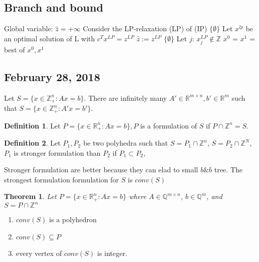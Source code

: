 \documentclass{article}
\theoremstyle{plain}
\newtheorem{thm}{Theorem}
\theoremstyle{definition}
\newtheorem{defn}{Definition}
\begin{document}
\subsection{Branch and bound}
\begin{algorithmic}[1]
    \State Global variable: $\hat{z} = +\infty$
        \State Consider the LP-relaxation (LP) of (IP)
         \Return $\{\emptyset\}$
        \EndIf
        \State Let $x^{lp}$ be an optimal solution of L with $c^Tx^{LP} = z^{LP}$
            \State $\hat{z} := z^{LP}$
            \Else
            \State \Return $\{\emptyset\}$
            \EndIf
        \EndIf
        \State Let $j$: $x_j^{LP}\not\in\mathbb{Z}$
        \State $x^0$ = 
        \State $x^1$ = 
        \State \Return best of $x^0, x^1$
    \EndFunction
\end{algorithmic}

\subsection{February 28, 2018}
Let $S = \{x\in\mathbb{Z}^n_+: Ax = b\}$. There are infinitely many
$A'\in\mathbb{R}^{m\times n}, b'\in\mathbb{R}^m$ such that
$S = \{x\in\mathbb{Z}^n_+: A'x = b'\}$.

\begin{defn}
    Let $P = \{x\in\mathbb{R}^n_+: Ax=b\}, P$ is a formulation of $S$
    if $P\cap\mathbb{Z}^n = S$.
\end{defn}

\begin{defn}
    Let $P_1, P_2$ be two polyhedra such that $S = P_1\cap\mathbb{Z}^n$,
    $S = P_2\cap\mathbb{Z}^N$, $P_1$ is stronger formulation than $P_2$ if
    $P_1\subset P_2$,
\end{defn}

Stronger formulation are better because they can elad to small $b\&b$ tree. The strongest
formulation formulation for $S$ is $conv(S)$

\begin{thm}
    Let $P = \{x\in\mathbb{R}^n_+: Ax = b\}$ where $A\in\mathbb{Q}^{m\times n}$,
    $b\in\mathbb{Q}^m$, and $S = P\cap\mathbb{Z}^n$
\end{thm}

\begin{enumerate}
    \item $conv(S)$ is a polyhedron
    \item $conv(S) \subseteq P$
    \item every vertex of $conv(S)$ is integer.
\end{enumerate}
\end{document}

